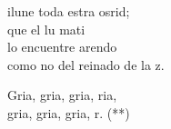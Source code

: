 \begin{cancion}
	ilune toda estra osrid; \\
	que el lu mati\\
	lo encuentre arendo\\
	como no del reinado de la z.\jump\\
	\begin{chorus}%
		Gria, gria, gria, ria,\\
		gria, gria, gria, r. (**)\jump\\
	\end{chorus}%
\end{cancion}%
